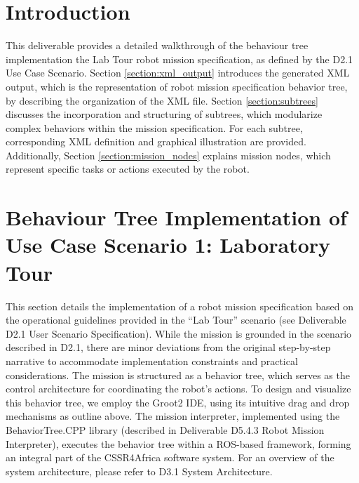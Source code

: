 \documentclass{CSSRforAfrica}
\begin{document}
\pagebreak
\tableofcontents
\newpage


\section{Introduction}
 \label{section:introduction}

This deliverable provides a detailed walkthrough of the behaviour tree implementation  the Lab Tour robot mission specification, as defined by the D2.1 Use Case Scenario. Section \ref{section:xml_output}  introduces the generated XML output, which is the representation of robot mission specification behavior tree, by describing the organization of the XML file. Section \ref{section:subtrees} discusses the incorporation and structuring of subtrees, which modularize complex behaviors within the mission specification. For each subtree, corresponding XML definition and graphical illustration are provided. Additionally, Section \ref{section:mission_nodes} explains mission nodes, which represent specific tasks or actions executed by the robot.



 
\section{Behaviour Tree Implementation of Use Case Scenario 1: Laboratory Tour}
\label{section:bt_implementation}

This section details the implementation of a robot mission specification based on the operational guidelines provided in the ``Lab Tour'' scenario (see Deliverable D2.1 User Scenario Specification). While the mission is grounded in the scenario described in D2.1, there are minor deviations from the original step-by-step narrative to accommodate implementation constraints and practical considerations. The mission is structured as a behavior tree, which serves as the control architecture for coordinating the robot’s actions. To design and visualize this behavior tree, we employ the Groot2 IDE, using its intuitive drag and drop mechanisms as outline above. The mission interpreter, implemented using the BehaviorTree.CPP library (described in Deliverable D5.4.3 Robot Mission Interpreter), executes the behavior tree within a ROS-based framework, forming an integral part of the CSSR4Africa software system. For an overview of the system architecture, please refer to D3.1 System Architecture.
\end{document}
